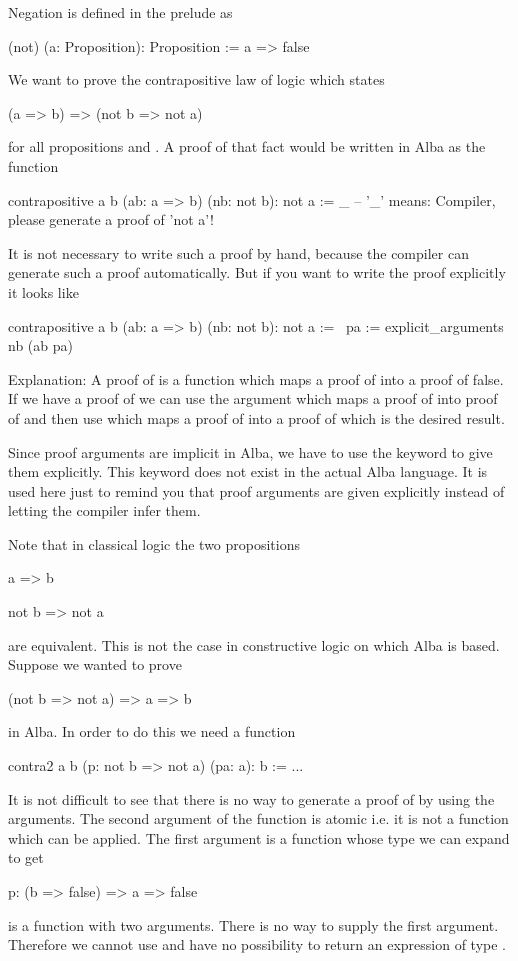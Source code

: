 Negation is defined in the prelude as
\begin{alba}
  (not) (a: Proposition): Proposition :=
    a => false
\end{alba}

We want to prove the contrapositive law of logic which states
\begin{alba}
  (a => b) => (not b => not a)
\end{alba}
for all propositions  and . A proof of that fact would be
written in Alba as the function
%
\begin{alba}
  contrapositive a b (ab: a => b) (nb: not b): not a :=
    _      -- '_' means: Compiler, please generate a proof of 'not a'!
\end{alba}
%
It is not necessary to write such a proof by hand, because the compiler can
generate such a proof automatically. But if you want to write the proof
explicitly it looks like

\begin{alba}
  contrapositive a b (ab: a => b) (nb: not b): not a :=
    \ pa :=
        explicit_arguments
          nb (ab pa)
\end{alba}

\noindent Explanation: A proof of  is a function which maps a
proof of  into a proof of false. If we have a proof of  we can
use the argument  which maps a proof of  into proof of
 and then use  which maps a proof of  into a proof of
 which is the desired result.

Since proof arguments are implicit in Alba, we have to use the keyword
 to give them explicitly. This keyword does not
exist in the actual Alba language. It is used here just to remind you that
proof arguments are given explicitly instead of letting the compiler infer
them.


Note that in classical logic the two propositions
\begin{alba}
  a  =>  b

  not b => not a
\end{alba}
%
are equivalent. This is not the case in constructive logic on which Alba is
based. Suppose we wanted to prove
%
\begin{alba}
  (not b => not a) => a => b
\end{alba}
%
in Alba. In order to do this we need a function
\begin{alba}
  contra2 a b (p: not b => not a) (pa: a): b :=
     ...
\end{alba}
%
It is not difficult to see that there is no way to generate a proof of 
by using the arguments. The second argument of the function is atomic i.e. it
is not a function which can be applied. The first argument is a function whose
type we can expand to get
\begin{alba}
  p: (b => false) => a => false
\end{alba}
%
 is a function with two arguments. There is no way to supply the first
argument. Therefore we cannot use  and have no possibility to return
an expression of type .


